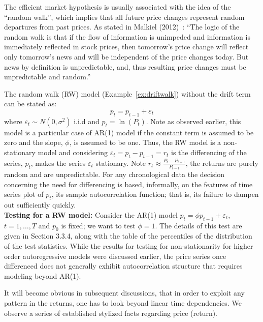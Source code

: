 The efficient market hypothesis is usually associated with the idea of the ``random walk'', which implies that all future price changes represent random departures from past prices. As stated in Malkiel (2012)~\cite{malkiel}: ``The logic of the random walk is that if the flow of information is unimpeded and information is immediately reflected in stock prices, then tomorrow's price change will reflect only tomorrow's news and will be independent of the price changes today. But news by definition is unpredictable, and, thus resulting price changes must be unpredictable and random.''


The random walk (RW) model (Example~\ref{ex:driftwalk}) without the drift term can be stated as:
	\begin{equation}\label{eqn:2pteq}
	p_t = p_{t-1} + \varepsilon_t
	\end{equation}
where $\varepsilon_t \sim N(0,\sigma^2)$ i.i.d and $p_t = \ln{(P_t)}$. Note as observed earlier, this model is a particular case of AR(1) model if the constant term is assumed to be zero and the slope, $\phi$, is assumed to be one. Thus, the RW model is a non-stationary model and considering $\varepsilon_t = p_t - p_{t-1}=r_t$ is the differencing of the series, $p_t$, makes the series $\varepsilon_t$ stationary. Note $r_t \approx \frac{P_t - P_{t-1}}{P_{t-1}}$,  the returns are purely random and are unpredictable. For any chronological data the decision concerning the need for differencing is based, informally, on the features of time series plot of $p_t$, its sample autocorrelation function; that is, its failure to dampen out sufficiently quickly. \\


\noindent\textbf{Testing for a RW model:} Consider the AR(1) model $p_t = \phi p_{t-1} + \varepsilon_t$, $t = 1,\ldots,T$ and $p_0$ is fixed; we want to test $\phi = 1$. The details of this test are given in Section 3.3.4, along with the table of the percentiles of the distribution of the test statistics. While the results for testing for non-stationarity for higher order autoregressive models were discussed earlier, the price series once differenced does not generally exhibit autocorrelation structure that requires modeling beyond AR(1).


It will become obvious in subsequent discussions, that in order to exploit any pattern in the returns, one has to look beyond linear time dependencies. We observe a series of established stylized facts regarding price (return). \\


